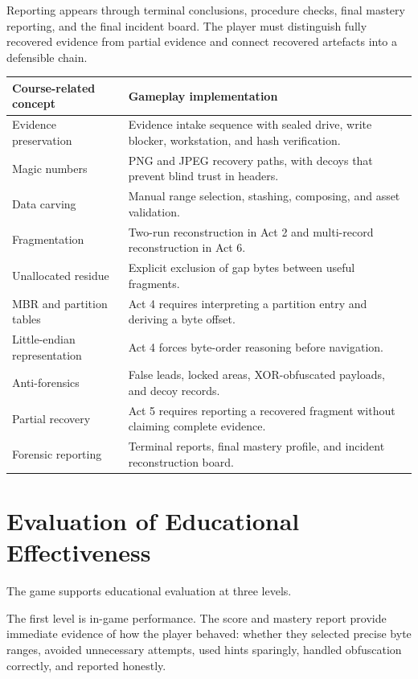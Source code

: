 \documentclass[11pt,a4paper]{article}
\begin{document}
Reporting appears through terminal conclusions, procedure checks, final mastery reporting, and the final incident board. The player must distinguish fully recovered evidence from partial evidence and connect recovered artefacts into a defensible chain.

\begin{longtable}{p{}p{}}
\toprule
\textbf{Course-related concept} & \textbf{Gameplay implementation} \\
\midrule
Evidence preservation & Evidence intake sequence with sealed drive, write blocker, workstation, and hash verification. \\
Magic numbers & PNG and JPEG recovery paths, with decoys that prevent blind trust in headers. \\
Data carving & Manual range selection, stashing, composing, and asset validation. \\
Fragmentation & Two-run reconstruction in Act 2 and multi-record reconstruction in Act 6. \\
Unallocated residue & Explicit exclusion of gap bytes between useful fragments. \\
MBR and partition tables & Act 4 requires interpreting a partition entry and deriving a byte offset. \\
Little-endian representation & Act 4 forces byte-order reasoning before navigation. \\
Anti-forensics & False leads, locked areas, XOR-obfuscated payloads, and decoy records. \\
Partial recovery & Act 5 requires reporting a recovered fragment without claiming complete evidence. \\
Forensic reporting & Terminal reports, final mastery profile, and incident reconstruction board. \\
\bottomrule
\end{longtable}

\section{Evaluation of Educational Effectiveness}

The game supports educational evaluation at three levels.

The first level is in-game performance. The score and mastery report provide immediate evidence of how the player behaved: whether they selected precise byte ranges, avoided unnecessary attempts, used hints sparingly, handled obfuscation correctly, and reported honestly.
\end{document}
